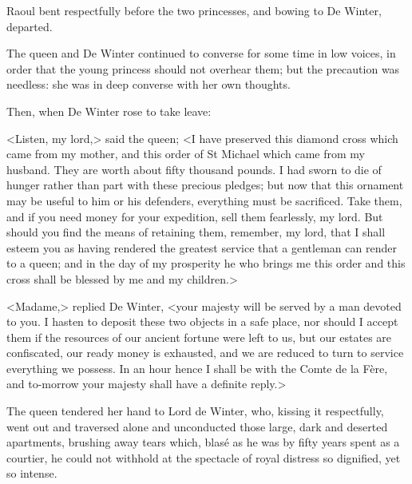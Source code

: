 Raoul bent respectfully before the two princesses, and bowing to De Winter, departed.

The queen and De Winter continued to converse for some time in low voices, in order that the young princess should not overhear them; but the precaution was needless: she was in deep converse with her own thoughts.

Then, when De Winter rose to take leave:

<Listen, my lord,> said the queen; <I have preserved this diamond cross which came from my mother, and this order of St Michael which came from my husband. They are worth about fifty thousand pounds. I had sworn to die of hunger rather than part with these precious pledges; but now that this ornament may be useful to him or his defenders, everything must be sacrificed. Take them, and if you need money for your expedition, sell them fearlessly, my lord. But should you find the means of retaining them, remember, my lord, that I shall esteem you as having rendered the greatest service that a gentleman can render to a queen; and in the day of my prosperity he who brings me this order and this cross shall be blessed by me and my children.>

<Madame,> replied De Winter, <your majesty will be served by a man devoted to you. I hasten to deposit these two objects in a safe place, nor should I accept them if the resources of our ancient fortune were left to us, but our estates are confiscated, our ready money is exhausted, and we are reduced to turn to service everything we possess. In an hour hence I shall be with the Comte de la Fère, and to-morrow your majesty shall have a definite reply.>

The queen tendered her hand to Lord de Winter, who, kissing it respectfully, went out and traversed alone and unconducted those large, dark and deserted apartments, brushing away tears which, blasé as he was by fifty years spent as a courtier, he could not withhold at the spectacle of royal distress so dignified, yet so intense. 
